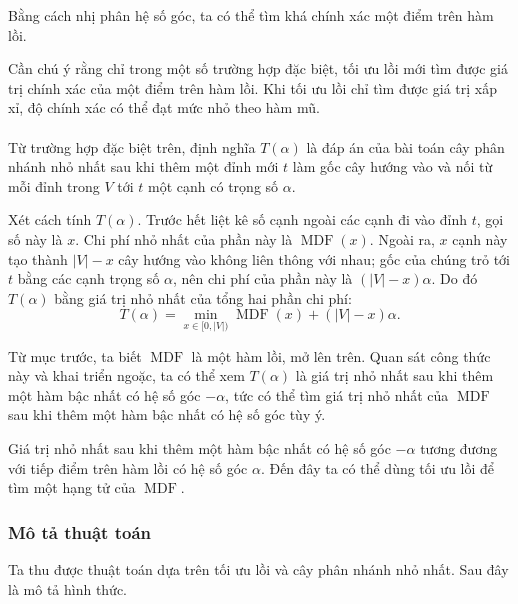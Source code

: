 \documentclass[11pt]{article}
\begin{document}
Bằng cách nhị phân hệ số góc, ta có thể tìm khá chính xác một điểm trên hàm
lồi.

Cần chú ý rằng chỉ trong một số trường hợp đặc biệt, tối ưu lồi mới tìm được
giá trị chính xác của một điểm trên hàm lồi. Khi tối ưu lồi chỉ tìm được giá trị
xấp xỉ, độ chính xác có thể đạt mức nhỏ theo hàm mũ.

\paragraph{}
Từ trường hợp đặc biệt trên, định nghĩa \(T(\alpha)\) là đáp án của bài toán
cây phân nhánh nhỏ nhất sau khi thêm một đỉnh mới \(t\) làm gốc cây hướng vào
và nối từ mỗi đỉnh trong \(V\) tới \(t\) một cạnh có trọng số \(\alpha\).

Xét cách tính \(T(\alpha)\). Trước hết liệt kê số cạnh ngoài các cạnh đi vào
đỉnh \(t\), gọi số này là \(x\). Chi phí nhỏ nhất của phần này là
\(\operatorname{MDF}(x)\). Ngoài ra, \(x\) cạnh này tạo thành \(|V|-x\) cây
hướng vào không liên thông với nhau; gốc của chúng trỏ tới \(t\) bằng các cạnh
trọng số \(\alpha\), nên chi phí của phần này là \((|V|-x)\alpha\). Do đó
\(T(\alpha)\) bằng giá trị nhỏ nhất của tổng hai phần chi phí:
\[
T(\alpha)=\min_{x\in[0,|V|)}\operatorname{MDF}(x)+(|V|-x)\alpha.
\]

Từ mục trước, ta biết \(\operatorname{MDF}\) là một hàm lồi, mở lên trên. Quan
sát công thức này và khai triển ngoặc, ta có thể xem \(T(\alpha)\) là giá trị
nhỏ nhất sau khi thêm một hàm bậc nhất có hệ số góc \(-\alpha\), tức có thể tìm
giá trị nhỏ nhất của \(\operatorname{MDF}\) sau khi thêm một hàm bậc nhất có hệ
số góc tùy ý.

Giá trị nhỏ nhất sau khi thêm một hàm bậc nhất có hệ số góc \(-\alpha\) tương
đương với tiếp điểm trên hàm lồi có hệ số góc \(\alpha\). Đến đây ta có thể
dùng tối ưu lồi để tìm một hạng tử của \(\operatorname{MDF}\).

\subsubsection{Mô tả thuật toán}

Ta thu được thuật toán dựa trên tối ưu lồi và cây phân nhánh nhỏ nhất. Sau đây
là mô tả hình thức.
\end{document}
